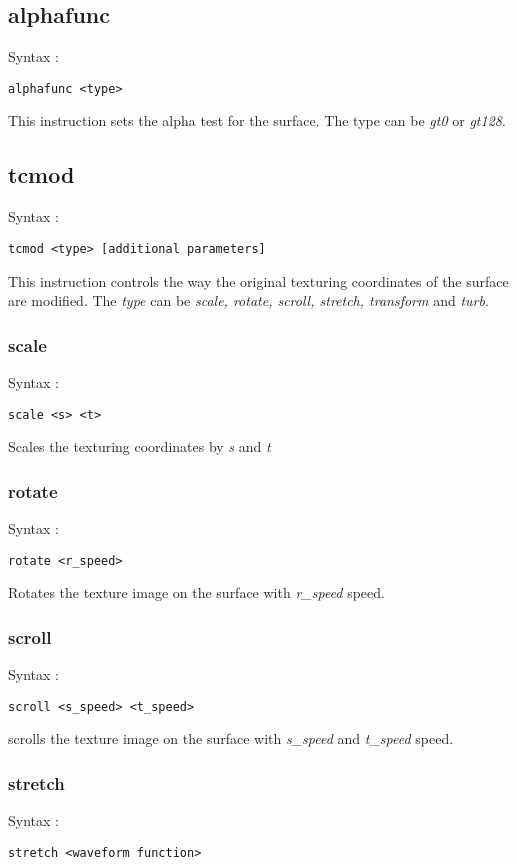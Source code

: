 \documentclass[12pt, titlepage]{amsart}
\begin{document}
\subsection{alphafunc}
Syntax :
\begin{verbatim}
alphafunc <type>
\end{verbatim}

This instruction sets the alpha test for the surface. The type can be
\textit{gt0} or \textit{gt128}.

\subsection{tcmod}
Syntax :
\begin{verbatim}
tcmod <type> [additional parameters]
\end{verbatim}

This instruction controls the way the original texturing coordinates
of the surface are modified. The \textit{type} can be
\textit{scale, rotate, scroll, stretch, transform} and \textit{turb}.

\subsubsection{scale}
Syntax :
\begin{verbatim}
scale <s> <t>
\end{verbatim}

Scales the texturing coordinates by \textit{s} and \textit{t}

\subsubsection{rotate}
Syntax :
\begin{verbatim}
rotate <r_speed>
\end{verbatim}

Rotates the texture image on the surface with \textit{r\_speed} speed.

\subsubsection{scroll}
Syntax :
\begin{verbatim}
scroll <s_speed> <t_speed>
\end{verbatim}

scrolls the texture image on the surface with \textit{s\_speed} and
\textit{t\_speed} speed.

\subsubsection{stretch}
Syntax :
\begin{verbatim}
stretch <waveform function>
\end{verbatim}
\end{document}

